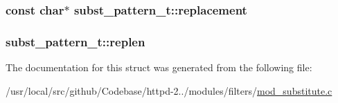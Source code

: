 \subsubsection[{\texorpdfstring{replacement}{replacement}}]{\setlength{\rightskip}{0pt plus 5cm}const char$\ast$ subst\+\_\+pattern\+\_\+t\+::replacement}\hypertarget{structsubst__pattern__t_a7d93fdafe14c88621b37a2fd95963efa}{}\label{structsubst__pattern__t_a7d93fdafe14c88621b37a2fd95963efa}
\subsubsection[{\texorpdfstring{replen}{replen}}]{ subst\+\_\+pattern\+\_\+t\+::replen}\hypertarget{structsubst__pattern__t_aa643b69b26a4991bd33a5b428892bfdd}{}\label{structsubst__pattern__t_aa643b69b26a4991bd33a5b428892bfdd}


The documentation for this struct was generated from the following file\+:\begin{DoxyCompactItemize}
\item 
/usr/local/src/github/\+Codebase/httpd-\/2../modules/filters/\hyperlink{mod__substitute_8c}{mod\+\_\+substitute.\+c}\end{DoxyCompactItemize}
